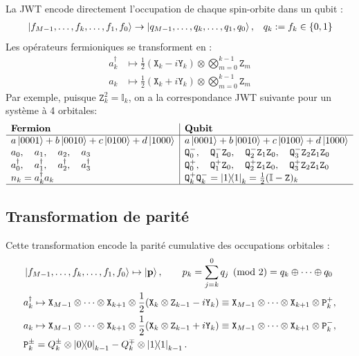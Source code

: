 \documentclass[12pt,a4paper,svgnames,x11names,rgb,table]{article} %
\numberwithin{equation}{section} %
\numberwithin{figure}{section} %
\numberwithin{table}{section} %
\begin{document}
La JWT encode directement l'occupation de chaque spin-orbite dans un qubit :
\begin{align}
&\ket{f_{M-1},\dots,f_k,\dots, f_1,f_0} \rightarrow \ket{q_{M-1},\dots,q_k,\dots, q_1, q_0}, 
&q_k := f_k \in \{0, 1\}
\end{align}
Les opérateurs fermioniques se transforment en :
\begin{align}
a_k^\dagger &\mapsto \frac12(\mathtt{X}_k - i\mathtt{Y}_k) \otimes \bigotimes_{m=0}^{k-1} \mathtt{Z}_m \label{eq:jwt_creation} \\
a_k &\mapsto \frac12(\mathtt{X}_k + i\mathtt{Y}_k) \otimes \bigotimes_{m=0}^{k-1} \mathtt{Z}_m \label{eq:jwt_annihilation}
\end{align}
Par exemple, puisque $\mathtt{Z}_k^2=\mathbb{I}_k$, on a la correspondance JWT suivante pour un système à 4 orbitales:
$$
\begin{array}{l|l}
\textbf{Fermion}  & \textbf{Qubit}  \\\hline
a\ket{0001}+b\ket{0010}+c\ket{0100}+d\ket{1000} & a\ket{0001}+b\ket{0010}+c\ket{0100}+d\ket{1000} \\
a_0,\quad  a_1,\quad  a_2,\quad a_3 &\mathtt{Q}^-_0,\quad \mathtt{Q}^-_1\mathtt{Z}_0,\quad \mathtt{Q}^-_2\mathtt{Z}_1 \mathtt{Z}_0,\quad \mathtt{Q}^-_3\mathtt{Z}_2 \mathtt{Z}_1 \mathtt{Z}_0 \\
a^\dagger_0,\quad a^\dagger_1,\quad a^\dagger_2,\quad a^\dagger_3 & \mathtt{Q}^+_0,\quad \mathtt{Q}^+_1\mathtt{Z}_0,\quad \mathtt{Q}^+_2\mathtt{Z}_1 \mathtt{Z}_0,\quad \mathtt{Q}^+_3\mathtt{Z}_2 \mathtt{Z}_1 \mathtt{Z}_0 \\
n_k = a^\dagger_k a_k &\mathtt{Q}^+_k \mathtt{Q}^-_k = \op{1}_k=\frac12(\mathbb{I} - \mathtt{Z})_k \\\hline
\end{array}
$$

\subsection{Transformation de parité}

Cette transformation encode la parité cumulative des occupations orbitales :
\begin{align}
&\ket{f_{M-1},\dots,f_k,\dots, f_1,f_0} \mapsto \ket{\mathbf{p}} , \qquad p_k = \sum_{j=k}^0 q_j \pmod 2 = q_k\oplus\dots\oplus q_0\\
& a^\dagger_k \mapsto \mathtt{X}_{M-1} \otimes \dots \otimes \mathtt{X}_{k+1} \otimes
\frac12(\mathtt{X}_k\otimes \mathtt{Z}_{k-1} - i \mathtt{Y}_k)\equiv \mathtt{X}_{M-1} \otimes \dots \otimes \mathtt{X}_{k+1} \otimes \mathtt{P}_k^+,\\
& a_k \mapsto \mathtt{X}_{M-1} \otimes \dots \otimes \mathtt{X}_{k+1} \otimes
\frac12(\mathtt{X}_k\otimes \mathtt{Z}_{k-1} + i \mathtt{Y}_k)\equiv \mathtt{X}_{M-1} \otimes \dots \otimes \mathtt{X}_{k+1} \otimes \mathtt{P}_k^-,\\
&\mathtt{P}_k^\pm =Q^\pm_k \otimes \op{0}_{k-1} - Q^\mp_k \otimes \op{1}_{k-1} .
\end{align}
\end{document}
